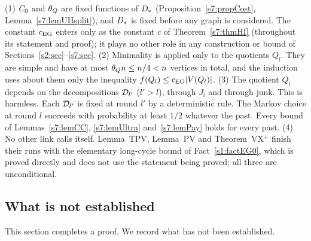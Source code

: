 \begin{remark}\label{s7:remNonCirc}
(1) $C_{0}$ and $\theta_{Q}$ are fixed functions of $D_{*}$
(Proposition~\ref{s7:propCost}, Lemma~\ref{s7:lemUHsplit}), and $D_{*}$ is fixed
before any graph is considered. The constant $c_{\mathrm{EG}}$ enters only as the
constant $c$ of Theorem~\ref{s7:thmHI} (throughout its statement and
proof); it plays no other role in any construction or bound of
Sections~\ref{s2:sec}--\ref{s7:sec}.
(2) Minimality is applied only to the quotients $Q_l$. They are simple and have
at most $\theta_{Q} n\le n/4<n$ vertices in total, and the induction uses about
them only the inequality $f(Q_l)\le c_{\mathrm{EG}}|V(Q_l)|$.
(3) The quotient $Q_l$ depends on the decompositions $\mathcal{D}_{l'}$ ($l'>l$), through
$J_l$ and through junk. This is harmless. Each $\mathcal{D}_{l'}$ is fixed at round $l'$
by a deterministic rule. The Markov choice at round $l$ succeeds with
probability at least $1/2$ whatever the past. Every bound of
Lemmas~\ref{s7:lemCC}, \ref{s7:lemUltra} and~\ref{s7:lemPay} holds for every
past.
(4) No other link calls itself. Lemma~TPV, Lemma~PV and Theorem~VX$^+$
finish their runs with the elementary long-cycle bound of
Fact~\ref{s1:factEG0}, which is proved directly and does not use the statement
being proved; all three are unconditional.
\deps{\ref{s7:thmHI}, \ref{s7:thmJVps}, \ref{s7:propCost}, \ref{s7:lemUHsplit}, \ref{s7:lemCC}, \ref{s7:lemUltra}, \ref{s7:lemPay}, \ref{s7:lemSimple}, \ref{s7:consRound}, \ref{s4:lemTPV}, \ref{s4:lemPV}, \ref{s4:thmVXp}, \ref{s1:condG4}, \ref{s1:factEG0}}
\end{remark}

\subsection*{What is not established}

This section completes a \candidate{} proof. We record what has not been
established.

